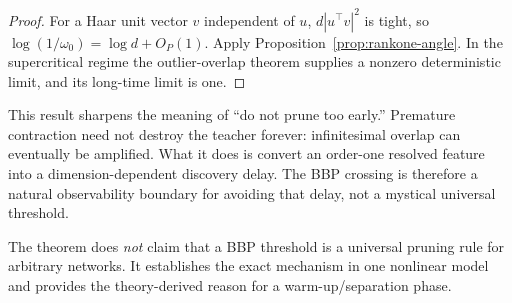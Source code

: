 \begin{proof}
For a Haar unit vector $v$ independent of $u$, $d|u^\top v|^2$ is tight, so $\log(1/\omega_0)=\log d+O_P(1)$. Apply Proposition~\ref{prop:rankone-angle}. In the supercritical regime the outlier-overlap theorem supplies a nonzero deterministic limit, and its long-time limit is one.
\end{proof}

This result sharpens the meaning of ``do not prune too early.'' Premature contraction need not destroy the teacher forever: infinitesimal overlap can eventually be amplified. What it does is convert an order-one resolved feature into a dimension-dependent discovery delay. The BBP crossing is therefore a natural observability boundary for avoiding that delay, not a mystical universal threshold.

The theorem does \emph{not} claim that a BBP threshold is a universal pruning rule for arbitrary networks. It establishes the exact mechanism in one nonlinear model and provides the theory-derived reason for a warm-up/separation phase.
